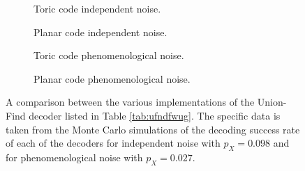 \begin{figure}[htbp]
  \centering
  \begin{subfigure}[b]{0.49\textwidth}
      \begin{adjustbox}{Clip=0 1em 0 0}
        
      \end{adjustbox}
      \caption{Toric code independent noise.}
  \end{subfigure}
  \begin{subfigure}[b]{0.49\textwidth}
      \begin{adjustbox}{Clip=0 1em 0 0}
        
      \end{adjustbox}
      \caption{Planar code independent noise.}
  \end{subfigure}
  \begin{subfigure}[b]{0.49\textwidth}
      \begin{adjustbox}{Clip=0 1em 0 0}
        
      \end{adjustbox}
      \caption{Toric code phenomenological noise.}
  \end{subfigure}
  \begin{subfigure}[b]{0.49\textwidth}
      \begin{adjustbox}{Clip=0 1em 0 0}
        
      \end{adjustbox}
      \caption{Planar code phenomenological noise.}
  \end{subfigure}
  \caption{A comparison between the various implementations of the Union-Find decoder listed in Table \ref{tab:ufndfwug}. The specific data is taken from the Monte Carlo simulations of the decoding success rate of each of the decoders for independent noise with $p_X = 0.098$ and for phenomenological noise with $p_X = 0.027$.}\label{fig:mwcomp_uf}
\end{figure}

